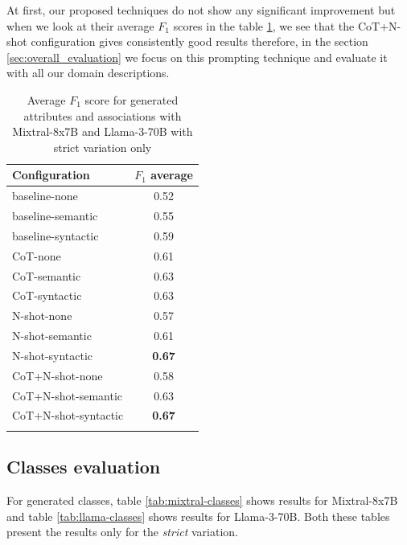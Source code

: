 At first, our proposed techniques do not show any significant improvement but when we look at their average $F_1$ scores in the table \ref{tab:F1_attributes_associations_average}, we see that the CoT+N-shot configuration gives consistently good results therefore, in the section \ref{sec:overall_evaluation} we focus on this prompting technique and evaluate it with all our domain descriptions.


\begin{table}[!h]
    \scriptsize
    \centering
    \setlength{\tabcolsep}{0.5em}
    \begin{tabular}{lc}
     \toprule
        Configuration & $F_1$ average \\
    \toprule
    
    \addlinespace
    baseline-none  & 0.52  \\
    baseline-semantic  & 0.55  \\
    baseline-syntactic  & 0.59  \\
    CoT-none	& 0.61  \\
    CoT-semantic & 0.63  \\
    CoT-syntactic & 0.63  \\
    N-shot-none & 0.57 \\
    N-shot-semantic & 0.61 \\
    N-shot-syntactic & \textbf{0.67} \\
    CoT+N-shot-none & 0.58 \\
    CoT+N-shot-semantic & 0.63 \\
    CoT+N-shot-syntactic & \textbf{0.67} \\
    \addlinespace
    \bottomrule
    \addlinespace
    \end{tabular}
    \caption{Average $F_1$ score for generated attributes and associations with Mixtral-8x7B and Llama-3-70B with strict variation only}
    \label{tab:F1_attributes_associations_average}
\end{table}


\subsection{Classes evaluation}

For generated classes, table \ref{tab:mixtral-classes} shows results for Mixtral-8x7B and table \ref{tab:llama-classes} shows results for Llama-3-70B. Both these tables present the results only for the \emph{strict} variation.

